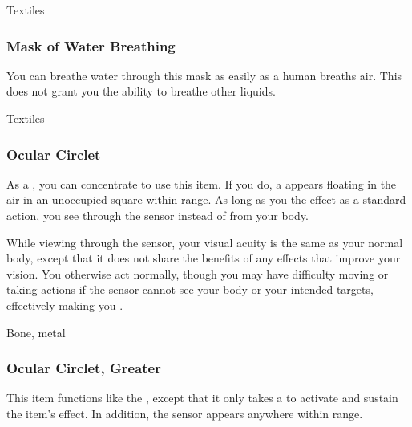  Textiles


\lowercase{\hypertarget{item:Mask of Water Breathing}{}}\label{item:Mask of Water Breathing}
\hypertarget{item:Mask of Water Breathing}{\subsubsection{Mask of Water Breathing\hfill{}}}

You can breathe water through this mask as easily as a human breaths air.
This does not grant you the ability to breathe other liquids.



 Textiles


\lowercase{\hypertarget{item:Ocular Circlet}{}}\label{item:Ocular Circlet}
\hypertarget{item:Ocular Circlet}{\subsubsection{Ocular Circlet\hfill{}}}

As a , you can concentrate to use this item.
If you do, a  appears floating in the air in an unoccupied square within \rngclose range.
As long as you  the effect as a standard action, you see through the sensor instead of from your body.

While viewing through the sensor, your visual acuity is the same as your normal body,
except that it does not share the benefits of any  effects that improve your vision.
You otherwise act normally, though you may have difficulty moving or taking actions if the sensor cannot see your body or your intended targets, effectively making you \blinded.



 


 Bone, metal


\lowercase{\hypertarget{item:Ocular Circlet, Greater}{}}\label{item:Ocular Circlet, Greater}
\hypertarget{item:Ocular Circlet, Greater}{\subsubsection{Ocular Circlet, Greater\hfill{}}}

This item functions like the , except that it only takes a  to activate and sustain the item's effect.
In addition, the sensor appears anywhere within \rngmed range.



